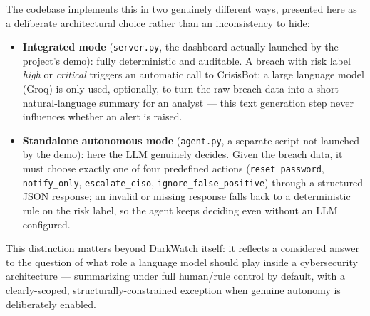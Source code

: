 \documentclass[12pt,a4paper]{report}
\begin{document}
The codebase implements this in two genuinely different ways, presented here as a deliberate architectural choice rather than an inconsistency to hide:

\begin{itemize}[nosep]
\item \textbf{Integrated mode} (\texttt{server.py}, the dashboard actually launched by the project's demo): fully deterministic and auditable. A breach with risk label \emph{high} or \emph{critical} triggers an automatic call to CrisisBot; a large language model (Groq) is only used, optionally, to turn the raw breach data into a short natural-language summary for an analyst --- this text generation step never influences whether an alert is raised.
\item \textbf{Standalone autonomous mode} (\texttt{agent.py}, a separate script not launched by the demo): here the LLM genuinely decides. Given the breach data, it must choose exactly one of four predefined actions (\texttt{reset\_password}, \texttt{notify\_only}, \texttt{escalate\_ciso}, \texttt{ignore\_false\_positive}) through a structured JSON response; an invalid or missing response falls back to a deterministic rule on the risk label, so the agent keeps deciding even without an LLM configured.
\end{itemize}

This distinction matters beyond DarkWatch itself: it reflects a considered answer to the question of what role a language model should play inside a cybersecurity architecture --- summarizing under full human/rule control by default, with a clearly-scoped, structurally-constrained exception when genuine autonomy is deliberately enabled.
\end{document}
